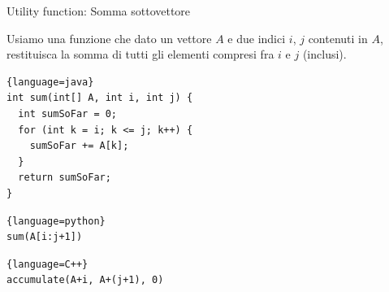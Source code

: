 \begin{frame}[fragile]{Utility function: Somma sottovettore}

Usiamo una funzione che dato un vettore $A$ e due indici $i$, $j$ contenuti in $A$, restituisca la somma di tutti gli elementi compresi fra $i$ e $j$ (inclusi).

\small
\begin{myboxtitle}[Java]
\vspace{-6pt}
\begin{lstlisting}{language=java}
int sum(int[] A, int i, int j) {
  int sumSoFar = 0;
  for (int k = i; k <= j; k++) {
    sumSoFar += A[k];
  }
  return sumSoFar;
}
\end{lstlisting}
\vspace{-6pt}
\end{myboxtitle}
\begin{multicols}{2}
\vspace{-6pt}
\begin{myboxtitle}[Python]
\begin{lstlisting}{language=python}
sum(A[i:j+1])
\end{lstlisting}
\vspace{-6pt}
\end{myboxtitle}
\vspace{-6pt}
\begin{myboxtitle}[C++]
\begin{lstlisting}{language=C++}
accumulate(A+i, A+(j+1), 0)
\end{lstlisting}
\vspace{-6pt}
\end{myboxtitle}
\end{multicols}


\end{frame}

%
%
%
%
%
%
%



